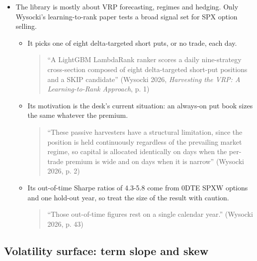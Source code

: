 \documentclass{article}
\begin{document}
\begin{itemize}

\item The library is mostly about VRP forecasting, regimes and hedging. Only Wysocki's learning-to-rank paper tests a broad signal set for SPX option selling.

\begin{itemize}

\item It picks one of eight delta-targeted short puts, or no trade, each day.

\begin{quote}``A LightGBM LambdaRank ranker scores a daily nine-strategy cross-section composed of eight delta-targeted short-put positions and a SKIP candidate'' (Wysocki 2026, \emph{Harvesting the VRP: A Learning-to-Rank Approach}, p. 1)\end{quote}

\item Its motivation is the desk's current situation: an always-on put book sizes the same whatever the premium.

\begin{quote}``These passive harvesters have a structural limitation, since the position is held continuously regardless of the prevailing market regime, so capital is allocated identically on days when the per-trade premium is wide and on days when it is narrow'' (Wysocki 2026, p. 2)\end{quote}

\item Its out-of-time Sharpe ratios of 4.3-5.8 come from 0DTE SPXW options and one hold-out year, so treat the size of the result with caution.

\begin{quote}``Those out-of-time figures rest on a single calendar year.'' (Wysocki 2026, p. 43)\end{quote}

\end{itemize}

\end{itemize}

\subsection{Volatility surface: term slope and skew}
\end{document}
